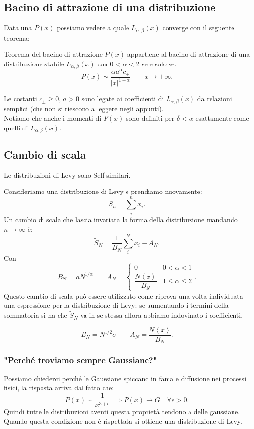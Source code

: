 \subsection{Bacino di attrazione di una distribuzione}%
\label{sub:Bacino di attrazione di una distribuzione}
Data una $P(x) $ possiamo vedere a quale $L_{\alpha,\beta  }(x)$ converge con il seguente teorema:
\begin{greenbox}{Teorema del bacino di attrazione}
    $P(x)$ appartiene al bacino di attrazione di una distribuzione stabile $L_{\alpha,\beta  }(x)$ con $0<\alpha <2$ se e solo se:
    \[
	P(x) \sim \frac{\alpha a^\alpha c_{\pm}}{\left|x\right|^{1+\alpha}} \qquad  x\to \pm\infty
    .\] 
\end{greenbox}
\noindent
Le costanti $c_{\pm}\ge 0$, $a>0$ sono legate ai coefficienti di $L_{\alpha,\beta  }(x)$ da relazioni semplici (che non si riescono a leggere negli appunti).\\
Notiamo che anche i momenti di $P(x)$ sono definiti per $\delta <\alpha$ esattamente come quelli di $L_{\alpha,\beta  }(x)$.  
\subsection{Cambio di scala}%
\label{sub:Cambio di scala}
\begin{redbox}{}
    Le distribuzioni di Levy sono Self-similari.
\end{redbox}
\noindent
Consideriamo una distribuzione di Levy e prendiamo nuovamente:
\[
    S_n = \sum_{i}^{n} x_i
.\] 
Un cambio di scala che lascia invariata la forma della distribuzione mandando $n\to \infty$ è:
\[
    \tilde{S}_N = \frac{1}{B_N}\sum_{i}^{N}x_i - A_N	
.\] 
Con
\[
    B_N = aN^{1 /\alpha} \qquad 
    A_N = 
    \begin{cases}
	0 & 0<\alpha <1\\
	\dfrac{N\left<x\right>}{B_N} & 1 \le \alpha\le 2
    \end{cases}
.\] 
Questo cambio di scala può essere utilizzato come riprova una volta individuata una espressione per la distribuzione di Levy: 
se aumentando i termini della sommatoria si ha che $\tilde{S}_N$ va in se stessa allora abbiamo indovinato i coefficienti.
\begin{exmp}[Gaussiana]
    \[
        B_N = N^{1 /2}\sigma \qquad A_N = \frac{N\left<x\right>}{B_N} 
    .\] 
\end{exmp}
\noindent
\subsubsection{"Perché troviamo sempre Gaussiane?"}%
\label{subsub:"Perché troviamo sempre Gaussiane?"}
Possiamo chiederci perché le Gaussiane spiccano in fama e diffusione nei processi fisici, la risposta arriva dal fatto che:
\[
    P(x) \sim \frac{1}{x^{3+\epsilon}} \implies P(x) \to G \quad \forall \epsilon >0
.\] 
Quindi tutte le distribuzioni aventi questa proprietà tendono a delle gaussiane. Quando questa condizione non è rispettata si ottiene una distribuzione di Levy.
